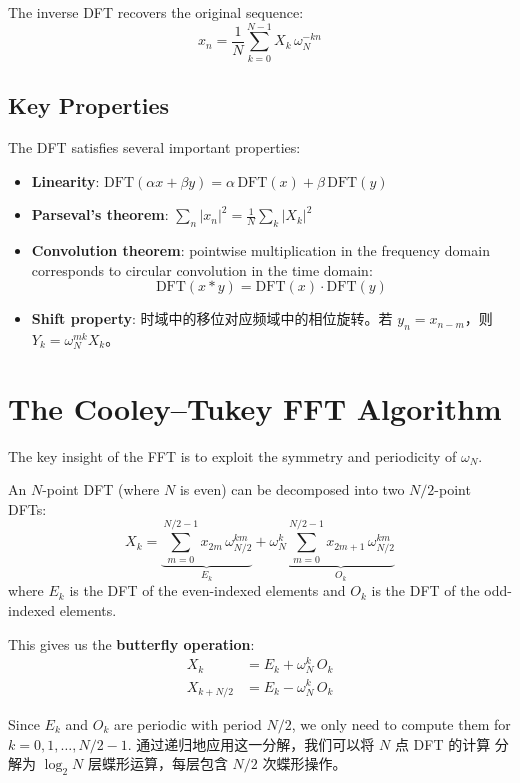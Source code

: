 \documentclass[12pt]{article}
\begin{document}
The inverse DFT recovers the original sequence:
\[
  x_n = \frac{1}{N} \sum_{k=0}^{N-1} X_k \, \omega_N^{-kn}
\]

\subsection{Key Properties}

The DFT satisfies several important properties:

\begin{itemize}
  \item \textbf{Linearity}: $\mathrm{DFT}(\alpha x + \beta y) = \alpha\,\mathrm{DFT}(x) + \beta\,\mathrm{DFT}(y)$
  \item \textbf{Parseval's theorem}: $\sum_{n} |x_n|^2 = \frac{1}{N} \sum_{k} |X_k|^2$
  \item \textbf{Convolution theorem}: pointwise multiplication in the frequency domain corresponds
        to circular convolution in the time domain:
        \[
          \mathrm{DFT}(x * y) = \mathrm{DFT}(x) \cdot \mathrm{DFT}(y)
        \]
  \item \textbf{Shift property}: 时域中的移位对应频域中的相位旋转。若 $y_n = x_{n-m}$，则
        $Y_k = \omega_N^{mk} X_k$。
\end{itemize}

\section{The Cooley--Tukey FFT Algorithm}\label{sec:fft}

The key insight of the FFT is to exploit the symmetry and periodicity of $\omega_N$.

\begin{theorem}
An $N$-point DFT (where $N$ is even) can be decomposed into two $N/2$-point DFTs:
\[
  X_k = \underbrace{\sum_{m=0}^{N/2-1} x_{2m} \, \omega_{N/2}^{km}}_{E_k}
      + \omega_N^k \underbrace{\sum_{m=0}^{N/2-1} x_{2m+1} \, \omega_{N/2}^{km}}_{O_k}
\]
where $E_k$ is the DFT of the even-indexed elements and $O_k$ is the DFT of the
odd-indexed elements.
\end{theorem}

This gives us the \textbf{butterfly operation}:
\begin{align}
  X_k       &= E_k + \omega_N^k \, O_k \\
  X_{k+N/2} &= E_k - \omega_N^k \, O_k
\end{align}

Since $E_k$ and $O_k$ are periodic with period $N/2$, we only need to compute them for
$k = 0, 1, \ldots, N/2 - 1$. 通过递归地应用这一分解，我们可以将 $N$ 点 DFT 的计算
分解为 $\log_2 N$ 层蝶形运算，每层包含 $N/2$ 次蝶形操作。
\end{document}
